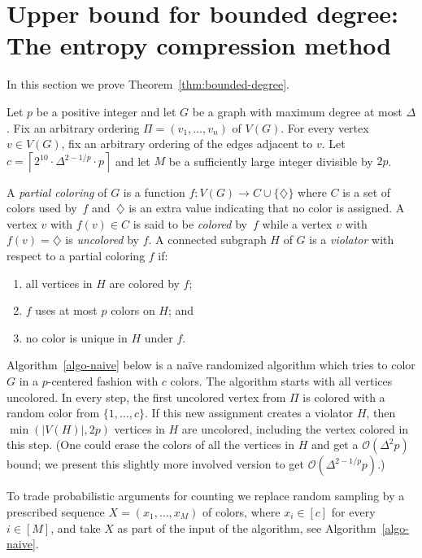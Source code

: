 \documentclass[11pt]{article}
\begin{document}
\section{Upper bound for bounded degree:
   The entropy compression method}
\label{sec-bounded-degree}

In this section we prove Theorem~\ref{thm:bounded-degree}.

Let $p$ be a positive integer and let $G$ be a graph with maximum degree at
most $\Delta$.  Fix an arbitrary ordering $\Pi=(v_1,\ldots,v_n)$ of $V(G)$.
For every vertex $v\in V(G)$, fix an arbitrary ordering of the edges adjacent
to $v$.  Let $c=\left\lceil2^{10}\cdot\Delta^{2-1/p}\cdot p\right\rceil$ and
let $M$ be a sufficiently large integer divisible by $2p$.

A \emph{partial coloring} of $G$ is a function $f: V(G)\to C\cup\{\diamondsuit\}$ 
where $C$ is a set of \textrm{colors} used by~$f$ and~$\diamondsuit$ is an extra value 
indicating that no color is assigned.
A vertex $v$ with $f(v)\in C$ is said to be \emph{colored} by~$f$ 
while a vertex $v$ with $f(v)=\diamondsuit$ is \emph{uncolored} by $f$.
A connected subgraph $H$ of $G$ is a \emph{violator} with respect to 
a partial coloring $f$ if:
\begin{enumerate}
\item all vertices in $H$ are colored by $f$;
\item $f$ uses at most $p$ colors on $H$; and
\item no color is unique in $H$ under $f$.
\end{enumerate}

Algorithm~\ref{algo-naive} below is a naïve randomized algorithm 
which tries to color $G$ in a $p$-centered fashion with $c$ colors.
The algorithm starts with all vertices uncolored.
In every step, the first uncolored vertex from $\Pi$ is colored with 
a random color from $\{1,\ldots,c\}$.
If this new assignment creates a violator $H$, then 
$\min(|V(H)|,2p)$ vertices in $H$ are uncolored, 
including the vertex colored in this step.
(One could erase the colors of all the vertices in $H$ and get a $\mathcal{O}(\Delta^2p)$ bound; 
we present this slightly more involved version to get $\mathcal{O}(\Delta^{2-1/p}p)$.)

To trade probabilistic arguments for counting we
replace random sampling by a prescribed sequence $X=(x_1,\ldots,x_M)$ of colors,
where $x_i\in [c]$ for every $i\in[M]$,
and take $X$ as part of the input of the algorithm,
see Algorithm~\ref{algo-naive}.
\end{document}

